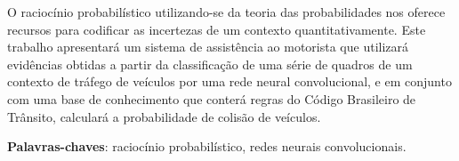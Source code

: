\documentclass[
	12pt,				%
    oneside,			%
	a4paper,			%
	english,			%
	french,				%
	spanish,			%
	brazil,				%
	]{abntex2}
\begin{document}
\frenchspacing 


\imprimircapa

\imprimirfolhaderosto*






\begin{resumo} %
O raciocínio probabilístico utilizando-se da teoria das probabilidades nos oferece recursos para codificar as incertezas de um contexto quantitativamente. Este trabalho apresentará um sistema de assistência ao motorista que utilizará evidências obtidas a partir da classificação de uma série de quadros de um contexto de tráfego de veículos por uma rede neural convolucional, e em conjunto com uma base de conhecimento que conterá regras do Código Brasileiro de Trânsito, calculará a probabilidade de colisão de veículos.


 \vspace{\onelineskip}
    
 \noindent
 \textbf{Palavras-chaves}: raciocínio probabilístico, redes neurais convolucionais.
\end{resumo} %

\end{document}
